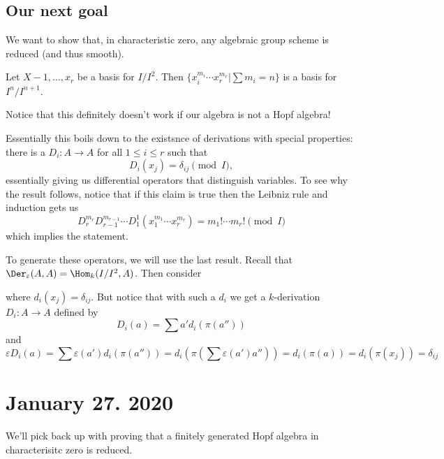 \documentclass[12pt]{article}
\begin{document}
\subsection{Our next goal}
We want to show that, in characteristic zero, any algebraic group scheme is reduced (and thus smooth).
\begin{lem}
	Let $X-1,\dots,x_r$ be a basis for $I/I^2$. Then $\{x_i^{m_i}\cdots x_r^{m_r}|\sum m_i=n\}$
	is a basis for $I^n/I^{n+1}$.
\end{lem}
\begin{rmk}
	Notice that this definitely doesn't work if our algebra is not a Hopf algebra! 
\end{rmk}
\begin{prf}
	Essentially this boils down to the existsnce of derivations with special properties: there is a $D_i:A\to A$ for all $1\le i\le r$
	such that 
	\[D_i(x_j)=\delta_{ij}\pmod{I},\]
	essentially giving us differential operators that distinguish variables.
	To see why the result follows, notice that if this claim is true then the Leibniz rule and induction gets us 
	\[D_r^{m_r}D_{r-1}^{m_{r-1}}\cdots D_1^1(x_1^{m_1}\cdots x_r^{m_r})=m_1!\cdots m_r!\pmod{I}\]
	which implies the statement.

	To generate these operators, we will use the last result. Recall that $\Der_\varepsilon(A,A)=\Hom_k(I/I^2,A)$. Then consider
	\begin{figure}[h]
		\centering
	\end{figure}
	
	\noindent where $d_i(x_j)=\delta_{ij}$. But notice that with such a $d_i$ we get a $k$-derivation $D_i:A\to A$
	defined by 
	\[D_i(a)=\sum a' d_i(\pi(a''))\]
	and 
	\[\varepsilon D_i(a)=\sum \varepsilon(a') d_i(\pi(a''))=d_i(\pi(\sum\varepsilon(a')a''))=d_i(\pi(a))=d_i(\pi(x_j))=\delta_{ij}\]
\end{prf}

\section{January 27. 2020}
We'll pick back up with proving that a finitely generated Hopf algebra in characterisitc zero is reduced.
\end{document}
